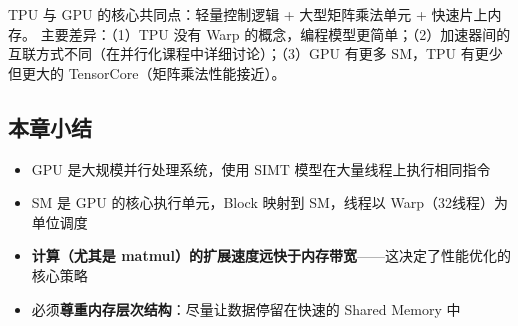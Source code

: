 TPU 与 GPU 的核心共同点：轻量控制逻辑 + 大型矩阵乘法单元 + 快速片上内存。
主要差异：（1）TPU 没有 Warp 的概念，编程模型更简单；（2）加速器间的互联方式不同（在并行化课程中详细讨论）；（3）GPU 有更多 SM，TPU 有更少但更大的 TensorCore（矩阵乘法性能接近）。

\subsection{本章小结}

\begin{itemize}
    \item GPU 是大规模并行处理系统，使用 SIMT 模型在大量线程上执行相同指令
    \item SM 是 GPU 的核心执行单元，Block 映射到 SM，线程以 Warp（32线程）为单位调度
    \item \textbf{计算（尤其是 matmul）的扩展速度远快于内存带宽}——这决定了性能优化的核心策略
    \item 必须\textbf{尊重内存层次结构}：尽量让数据停留在快速的 Shared Memory 中
\end{itemize}


